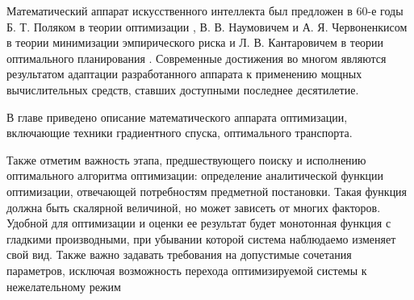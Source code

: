 Математический аппарат искусственного интеллекта был предложен в 60-е годы
Б. Т. Поляком в теории оптимизации \cite{kantorovich1960mathematical}, 
В. В. Наумовичем и А. Я. Червоненкисом \cite{вапник1974теория} в теории минимизации эмпирического риска
и Л. В. Кантаровичем в теории оптимального планирования \cite{kantorovich1960mathematical}.
Современные достижения во многом являются результатом адаптации разработанного аппарата к применению 
мощных вычислительных средств, ставших доступными последнее десятилетие.

В главе приведено описание математического аппарата оптимизации, включающие техники
градиентного спуска, оптимального транспорта.

Также отметим важность этапа, предшествующего поиску и исполнению оптимального алгоритма оптимизации:
определение аналитической функции оптимизации, отвечающей потребностям предметной постановки. 
Такая функция должна быть скалярной величиной, но может зависеть от многих факторов. Удобной для 
оптимизации и оценки ее результат будет монотонная функция с гладкими производными, при убывании которой 
система наблюдаемо изменяет свой вид. Также важно задавать требования на допустимые сочетания параметров, исключая возможность
перехода оптимизируемой системы к нежелательному режим
